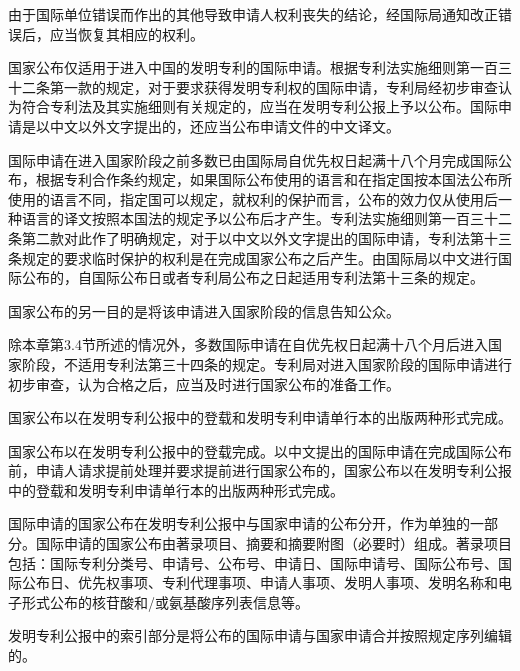 由于国际单位错误而作出的其他导致申请人权利丧失的结论，经国际局通知改正错误后，应当恢复其相应的权利。

国家公布仅适用于进入中国的发明专利的国际申请。根据专利法实施细则第一百三十二条第一款的规定，对于要求获得发明专利权的国际申请，专利局经初步审查认为符合专利法及其实施细则有关规定的，应当在发明专利公报上予以公布。国际申请是以中文以外文字提出的，还应当公布申请文件的中文译文。

国际申请在进入国家阶段之前多数已由国际局自优先权日起满十八个月完成国际公布，根据专利合作条约规定，如果国际公布使用的语言和在指定国按本国法公布所使用的语言不同，指定国可以规定，就权利的保护而言，公布的效力仅从使用后一种语言的译文按照本国法的规定予以公布后才产生。专利法实施细则第一百三十二条第二款对此作了明确规定，对于以中文以外文字提出的国际申请，专利法第十三条规定的要求临时保护的权利是在完成国家公布之后产生。由国际局以中文进行国际公布的，自国际公布日或者专利局公布之日起适用专利法第十三条的规定。

国家公布的另一目的是将该申请进入国家阶段的信息告知公众。

除本章第3.4节所述的情况外，多数国际申请在自优先权日起满十八个月后进入国家阶段，不适用专利法第三十四条的规定。专利局对进入国家阶段的国际申请进行初步审查，认为合格之后，应当及时进行国家公布的准备工作。

国家公布以在发明专利公报中的登载和发明专利申请单行本的出版两种形式完成。

国家公布以在发明专利公报中的登载完成。以中文提出的国际申请在完成国际公布前，申请人请求提前处理并要求提前进行国家公布的，国家公布以在发明专利公报中的登载和发明专利申请单行本的出版两种形式完成。

国际申请的国家公布在发明专利公报中与国家申请的公布分开，作为单独的一部分。国际申请的国家公布由著录项目、摘要和摘要附图（必要时）组成。著录项目包括：国际专利分类号、申请号、公布号、申请日、国际申请号、国际公布号、国际公布日、优先权事项、专利代理事项、申请人事项、发明人事项、发明名称和电子形式公布的核苷酸和/或氨基酸序列表信息等。

发明专利公报中的索引部分是将公布的国际申请与国家申请合并按照规定序列编辑的。


